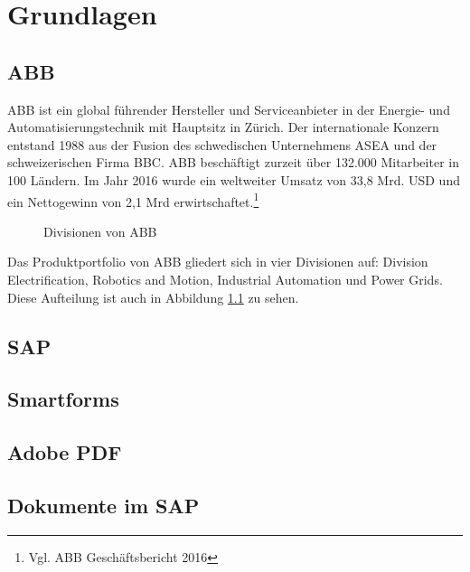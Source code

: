 
\chapter{Grundlagen}


\section{ABB}

ABB ist ein global f\"{u}hrender Hersteller und Serviceanbieter in der Energie- und Automatisierungstechnik mit Hauptsitz in Z\"{u}rich.
Der internationale Konzern entstand 1988 aus der Fusion des schwedischen Unternehmens \ac{ASEA} und der schweizerischen Firma \ac{BBC}. ABB besch\"{a}ftigt zurzeit \"{u}ber 132.000 Mitarbeiter in 100 L\"{a}ndern. Im Jahr 2016 wurde ein weltweiter Umsatz von 33,8 Mrd. USD und ein Nettogewinn von 2,1 Mrd erwirtschaftet.\footnote{Vgl. ABB Gesch\"{a}ftsbericht 2016} 
\linebreak



\begin{figure}[ht]
	\centering
	
	\caption{Divisionen von ABB}
	\label{fig1}
	
\end{figure}

Das Produktportfolio von ABB gliedert sich in vier Divisionen auf: Division Electrification, Robotics and Motion, Industrial Automation und Power Grids. Diese Aufteilung ist auch in Abbildung \ref{fig1} zu sehen.


\section{SAP}



\section{Smartforms}


\section{Adobe PDF}

\section{Dokumente im SAP}